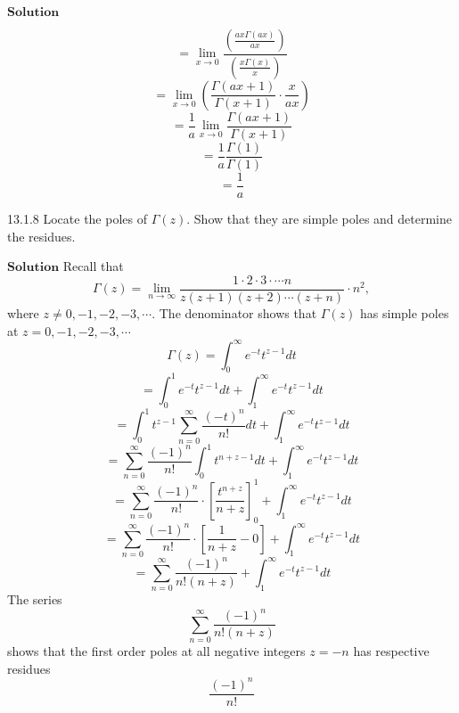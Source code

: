 \documentclass{styles/kaobook}
\begin{document}
$\boxed{\textbf{Solution}}$ 

$$=\lim _{x \rightarrow 0} \frac{\left(\frac{a x \Gamma(a x)}{a x}\right)}{\left(\frac{x \Gamma(x)}{x}\right)}$$
$$=\lim _{x \rightarrow 0}\left(\frac{\Gamma(a x+1)}{\Gamma(x+1)} \cdot \frac{x}{a x}\right)$$
$$=\frac{1}{a} \lim _{x \rightarrow 0} \frac{\Gamma(a x+1)}{\Gamma(x+1)}$$
$$=\frac{1}{a} \frac{\Gamma(1)}{\Gamma(1)}$$
$$=\frac{1}{a}$$


\begin{greenbox}{13.1.8}
Locate the poles of $\Gamma(z)$. Show that they are simple poles and determine the residues.
\end{greenbox}
$\boxed{\textbf{Solution}}$
Recall that 
$$\Gamma(z)=\lim _{n \rightarrow \infty} \frac{1 \cdot 2 \cdot 3 \cdot \cdots n}{z(z+1)(z+2) \cdots(z+n)} \cdot n^{2},$$ where $z \neq 0,-1,-2,-3, \cdots$. The denominator shows that $\Gamma(z)$ has simple poles at $z=0,-1,-2,-3, \cdots$
$$\Gamma(z)=\int_{0}^{\infty} e^{-t} t^{z-1} d t$$
$$=\int_{0}^{1} e^{-t} t^{z-1} d t+\int_{1}^{\infty} e^{-t} t^{z-1} d t$$
$$=\int_{0}^{1} t^{z-1} \sum_{n=0}^{\infty} \frac{(-t)^{n}}{n !} d t+\int_{1}^{\infty} e^{-t} t^{z-1} d t$$
$$=\sum_{n=0}^{\infty} \frac{(-1)^{n}}{n !} \int_{0}^{1} t^{n+z-1} d t+\int_{1}^{\infty} e^{-t} t^{z-1} d t$$
$$=\sum_{n=0}^{\infty} \frac{(-1)^{n}}{n !} \cdot\left[\frac{t^{n+z}}{n+z}\right]_{0}^{1}+\int_{1}^{\infty} e^{-t} t^{z-1} d t$$
$$=\sum_{n=0}^{\infty} \frac{(-1)^{n}}{n !} \cdot\left[\frac{1}{n+z}-0\right]+\int_{1}^{\infty} e^{-t} t^{z-1} d t$$
$$=\sum_{n=0}^{\infty} \frac{(-1)^{n}}{n !(n+z)}+\int_{1}^{\infty} e^{-t} t^{z-1} d t$$
The series 
$$\sum_{n=0}^{\infty} \frac{(-1)^{n}}{n !(n+z)}$$ 
shows that the first order poles at all negative integers $z=-n$ has respective residues 
$$\frac{(-1)^{n}}{n !}$$
\end{document}
